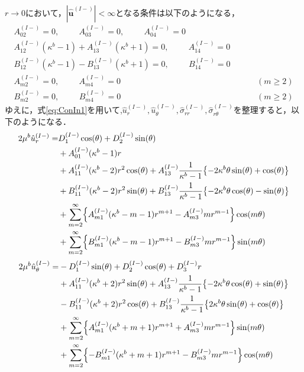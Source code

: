 $r\rightarrow0$において，$|\hat{\bm{u}}^{(I-)}|<\infty$となる条件は以下のようになる，
\begin{align}
	A_{02}^{(I-)}=0,\hspace{1cm}A_{03}^{(I-)}=0,\hspace{1cm}A_{04}^{(I-)}=0&
	\nonumber
	\\
	A_{12}^{(I-)}(\kappa^{b}-1)+A_{13}^{(I-)}(\kappa^{b}+1)=0,\hspace{1cm}A_{14}^{(I-)}=0&
	\nonumber
	\\
	B_{12}^{(I-)}(\kappa^{b}-1)-B_{13}^{(I-)}(\kappa^{b}+1)=0,\hspace{1cm}B_{14}^{(I-)}=0&
	\nonumber
	\\
	A_{m2}^{(I-)}=0,\hspace{1cm}A_{m4}^{(I-)}=0&\hspace{1cm}(m\geq2)
	\nonumber
	\\
	B_{m2}^{(I-)}=0,\hspace{1cm}B_{m4}^{(I-)}=0&\hspace{1cm}(m\geq2)
	\label{eq:ConIn1}
\end{align}
ゆえに，式\eqref{eq:ConIn1}を用いて,$\hat{u}_{r}^{(I-)},\hat{u}_{\theta}^{(I-)},\hat{\sigma}_{rr}^{(I-)},\hat{\sigma}_{r\theta}^{(I-)}$を整理すると，以下のようになる．
\begin{align}
	2\mu^{b}\hat{u}_{r}^{(I-)} =&D_{1}^{(I-)}\cos(\theta)+D_{2}^{(I-)}\sin(\theta)
	\nonumber
	\\
	&+A_{01}^{(I-)}(\kappa^{b}-1)r
	\nonumber
	\\
	&+A_{11}^{(I-)}(\kappa^{b}-2)r^2\cos(\theta)
	+A_{13}^{(I-)}\frac{1}{\kappa^{b}-1}\bigl\{ -2\kappa^{b}\theta\sin(\theta) +\cos(\theta) \bigr\}
	\nonumber
	\\
	&+B_{11}^{(I-)}(\kappa^{b}-2)r^2\sin(\theta)
	+B_{13}^{(I-)}\frac{1}{\kappa^{b}-1}\bigl\{ -2\kappa^{b}\theta\cos(\theta) -\sin(\theta) \bigr\}
	\nonumber
	\\
	&+\sum_{m=2}^{\infty}\Bigl\{A_{m1}^{(I-)}(\kappa^{b}-m-1)r^{m+1}
	-A_{m3}^{(I-)}mr^{m-1}\Bigr\}\cos(m\theta)
	\nonumber
	\\
	&+\sum_{m=2}^{\infty}\Bigl\{B_{m1}^{(I-)}(\kappa^{b}-m-1)r^{m+1}
	-B_{m3}^{(I-)}mr^{m-1}\Bigr\}\sin(m\theta)
	\label{eq:URIn1}
\end{align}
\begin{align}
	2\mu^{b}\hat{u}_{\theta}^{(I-)} =&-D_{1}^{(I-)}\sin(\theta)+D_{2}^{(I-)}\cos(\theta)+D_{3}^{(I-)}r
	\nonumber
	\\
	&+A_{11}^{(I-)}(\kappa^{b}+2)r^2\sin(\theta)
	+A_{13}^{(I-)}\frac{1}{\kappa^{b}-1}\bigl\{ -2\kappa^{b}\theta\cos(\theta) +\sin(\theta) \bigr\}
	\nonumber
	\\
	&-B_{11}^{(I-)}(\kappa^{b}+2)r^2\cos(\theta)
	+B_{13}^{(I-)}\frac{1}{\kappa^{b}-1}\bigl\{ 2\kappa^{b}\theta\sin(\theta) +\cos(\theta) \bigr\}
	\nonumber
	\\
	&+\sum_{m=2}^{\infty}\Bigl\{A_{m1}^{(I-)}(\kappa^{b}+m+1)r^{m+1}
	+A_{m3}^{(I-)}mr^{m-1}\Bigr\}\sin(m\theta)
	\nonumber
	\\
	&+\sum_{m=2}^{\infty}\Bigl\{-B_{m1}^{(I-)}(\kappa^{b}+m+1)r^{m+1}
	-B_{m3}^{(I-)}mr^{m-1}\Bigr\}\cos(m\theta)
	\label{eq:UThIn1}
\end{align}
